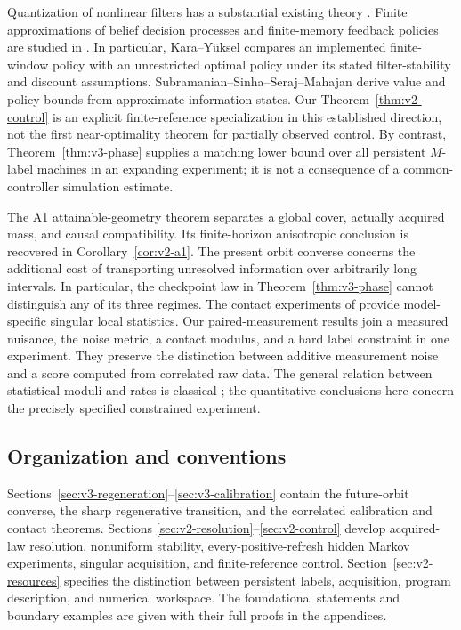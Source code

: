 Quantization of nonlinear filters has a substantial existing theory
\cite{PagesPham2005,KalogeriasPetropulu2016}. Finite approximations of
belief decision processes and finite-memory feedback policies are studied
in \cite{SaldiYukselLinder2017,KaraYuksel2022,KBY2024,DKY2024}.
In particular, Kara--Y\"uksel \cite[Theorem 12]{KaraYuksel2022} compares
an implemented finite-window policy with an unrestricted optimal policy
under its stated filter-stability and discount assumptions.
Subramanian--Sinha--Seraj--Mahajan \cite[Theorems 9 and 27]{SSSM2022}
derive value and policy bounds from approximate information states.
Our Theorem~\ref{thm:v2-control} is an explicit finite-reference
specialization in this established direction, not the first
near-optimality theorem for partially observed control. By contrast,
Theorem~\ref{thm:v3-phase} supplies a matching lower bound over all
persistent $M$-label machines in an expanding experiment; it is not a
consequence of a common-controller simulation estimate.

The A1 attainable-geometry theorem \cite{QiA1} separates a global cover,
actually acquired mass, and causal compatibility. Its finite-horizon
anisotropic conclusion is recovered in Corollary~\ref{cor:v2-a1}.
The present orbit converse concerns the additional cost of transporting
unresolved information over arbitrarily long intervals. In particular,
the checkpoint law in Theorem~\ref{thm:v3-phase} cannot distinguish
any of its three regimes. The contact experiments of \cite{QiA2}
provide model-specific singular local statistics. Our paired-measurement
results join a measured nuisance, the noise metric, a contact modulus,
and a hard label constraint in one experiment. They preserve the distinction
between additive measurement noise and a score computed from correlated
raw data. The general relation between statistical moduli and rates is
classical \cite{DonohoLiu1991}; the quantitative conclusions here concern
the precisely specified constrained experiment.

\subsection{Organization and conventions}
Sections~\ref{sec:v3-regeneration}--\ref{sec:v3-calibration} contain
the future-orbit converse, the sharp regenerative transition, and the
correlated calibration and contact theorems. Sections
\ref{sec:v2-resolution}--\ref{sec:v2-control} develop acquired-law
resolution, nonuniform stability, every-positive-refresh hidden Markov
experiments, singular acquisition, and finite-reference control.
Section~\ref{sec:v2-resources} specifies the distinction between
persistent labels, acquisition, program description, and numerical
workspace. The foundational statements and boundary examples are given
with their full proofs in the appendices.

